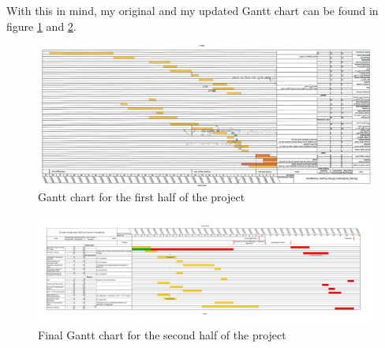 With this in mind, my original and my updated Gantt chart can be found in 
figure \ref{fig:gantt_halfway} and \ref{fig:gantt_final}.
\begin{landscape}
    \begin{figure}
        \centering
        \includegraphics[angle=180, width=\linewidth]{Thesis/GanttHalfway.pdf}
        \caption{Gantt chart for the first half of the project}
        \label{fig:gantt_halfway}
    \end{figure}
\end{landscape}
\begin{landscape}
    \begin{figure}
        \centering
        \includegraphics[width=\linewidth]{Thesis/GanttFinal.pdf}
        \caption{Final Gantt chart for the second half of the project}
        \label{fig:gantt_final}
    \end{figure}
\end{landscape}

